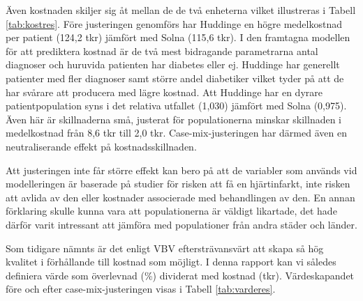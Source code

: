 Även kostnaden skiljer sig åt mellan de de två enheterna vilket illustreras i Tabell \ref{tab:kostres}. Före justeringen genomförs har Huddinge en högre medelkostnad per patient (124,2 tkr) jämfört med Solna (115,6 tkr). I den framtagna modellen för att prediktera kostnad är de två mest bidragande parametrarna antal diagnoser och huruvida patienten har diabetes eller ej. Huddinge har generellt patienter med fler diagnoser samt större andel diabetiker vilket tyder på att de har svårare att producera med lägre kostnad. Att Huddinge har en dyrare patientpopulation syns i det relativa utfallet (1,030) jämfört med Solna (0,975). Även här är skillnaderna små, justerat för populationerna minskar skillnaden i medelkostnad från 8,6 tkr till 2,0 tkr. Case-mix-justeringen har därmed även en neutraliserande effekt på kostnadsskillnaden.

Att justeringen inte får större effekt kan bero på att de variabler som används vid modelleringen är baserade på studier för risken att få en hjärtinfarkt, inte risken att avlida av den eller kostnader associerade med behandlingen av den. En annan förklaring skulle kunna vara att populationerna är väldigt likartade, det hade därför varit intressant att jämföra med populationer från andra städer och länder.

 

Som tidigare nämnts är det enligt VBV eftersträvansvärt att skapa så hög kvalitet i förhållande till kostnad som möjligt. I denna rapport kan vi således definiera värde som överlevnad (\%) dividerat med kostnad (tkr). Värdeskapandet före och efter case-mix-justeringen visas i Tabell \ref{tab:varderes}.

